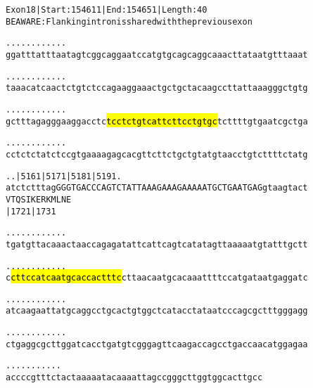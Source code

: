 \documentclass{article}
\begin{document}
\begin{alltt}
Exon 18 | Start: 154611 | End: 154651 | Length: 40
BE AWARE: Flanking intron is shared with the previous exon

.    .    .    .    .    .    .    .    .    .    .    .    
ggatttatttaatagtcggcaggaatccatgtgcagcaggcaaacttataatgtttaaat

.    .    .    .    .    .    .    .    .    .    .    .    
taaacatcaactctgtctccagaaggaaactgctgctacaagccttattaaagggctgtg

.    .    .    .    .    .    .    .    .    .    .    .    
gctttagagggaaggacctc\hl{tcctctgtcattcttcctgtgc}tcttttgtgaatcgctga

.    .    .    .    .    .    .    .    .    .    .    .    
cctctctatctccgtgaaaagagcacgttcttctgctgtatgtaacctgtcttttctatg

.    .            |5161     |5171     |5181     |5191  .    
atctctttagGGGTGACCCAGTCTATTAAAGAAAGAAAAATGCTGAATGAGgtaagtact
            V  T  Q  S  I  K  E  R  K  M  L  N  E           
                  |1721                         |1731       

.    .    .    .    .    .    .    .    .    .    .    .    
tgatgttacaaactaaccagagatattcattcagtcatatagttaaaaatgtatttgctt

.    .    .    .    .    .    .    .    .    .    .    .    
c\hl{cttccatcaatgcaccactttc}cttaacaatgcacaaattttccatgataatgaggatc

.    .    .    .    .    .    .    .    .    .    .    .    
atcaagaattatgcaggcctgcactgtggctcatacctataatcccagcgctttgggagg

.    .    .    .    .    .    .    .    .    .    .    .    
ctgaggcgcttggatcacctgatgtcgggagttcaagaccagcctgaccaacatggagaa

.    .    .    .    .    .    .    .    .    .    .
accccgtttctactaaaaatacaaaattagccgggcttggtggcacttgcc
\end{alltt}
\newpage
\end{document}
